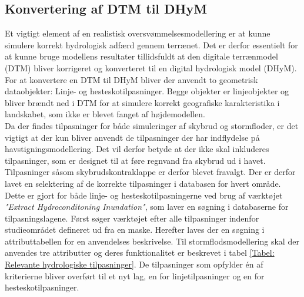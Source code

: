 
\subsection{Konvertering af DTM til DHyM} \label{Sektion: Konvertering af DTM til DHyM}
Et vigtigt element af en realistisk oversvømmelsesmodellering er at kunne simulere korrekt hydrologisk adfærd gennem terrænet. Det er derfor essentielt for at kunne bruge modellens resultater tillidsfuldt at den digitale terrænmodel (DTM) bliver korrigeret og konverteret til en digital hydrologisk model (DHyM).\\ 

For at konvertere en DTM til DHyM bliver der anvendt to geometrisk dataobjekter: Linje- og hesteskotilpasninger. Begge objekter er linjeobjekter og bliver brændt ned i DTM for at simulere korrekt geografiske karakteristika i landskabet, som ikke er blevet fanget af højdemodellen. \\
Da der findes tilpasninger for både simuleringer af skybrud og stormfloder, er det vigtigt at der kun bliver anvendt de tilpasninger der har indflydelse på havstigningsmodellering. Det vil derfor betyde at der ikke skal inkluderes tilpasninger, som er designet til at føre regnvand fra skybrud ud i havet. Tilpasninger såsom skybrudskontraklappe er derfor blevet fravalgt. Der er derfor lavet en selektering af de korrekte tilpasninger i databasen for hvert område.\\

Dette er gjort for både linje- og hesteskotilpasningerne ved brug af værktøjet \textit{"Extract Hydroconditoning Inundation"}, som laver en søgning i databaserne for tilpasningslagene. Først søger værktøjet efter alle tilpasninger indenfor studieområdet defineret ud fra en maske. Herefter laves der en søgning i attributtabellen for en anvendelses beskrivelse. Til stormflodsmodellering skal der anvendes tre attributter og deres funktionalitet er beskrevet i tabel \ref{Tabel: Relevante hydrologiske tilpasninger}. De tilpasninger som opfylder én af kriterierne bliver overført til et nyt lag, en for linjetilpasninger og en for hesteskotilpasninger.  

